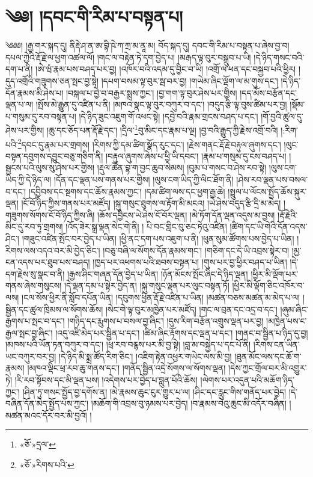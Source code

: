 \chapter{༄༅། །དབང་གི་རིམ་པ་བསྟན་པ།}༄༅༅། །རྒྱ་གར་སྐད་དུ། ནིརྡེ་ཤ་ན་ཨ་བྷི་ཥེ་ཀ་ཀྲ་མ་ནཱ་མ། བོད་སྐད་དུ། དབང་གི་རིམ་པ་བསྟན་པ་ཞེས་བྱ་བ། དཔལ་ཀྱེའི་རྡོ་རྗེ་ལ་ཕྱག་འཚལ་ལོ། །གང་ལ་བརྟེན་ཏེ་དག་བྱེད་པ། །མརྒད་ལྟ་བུར་བསྒྲུབ་པ་ཡི། །དེ་ཉིད་གསང་བའི་དག་པ་ནི། །ཨེ་ཝཾ་རྣམ་པས་བཤད་པར་བྱ། །འཁོར་བའི་འདམ་དུ་བྱིང་བ་ཡི། །འགྲོ་ལ་ཕན་དང་བསྐྱབ་པའི་ཕྱིར། །དུད་འགྲོའི་གཟུགས་ཅན་སྤང་བྱ་སྟེ། །དཔག་བསམ་ལྟ་བུར་སྦ་བར་བྱ། །གཡེམ་ཞིང་ལྡོག་ལ་མ་གུས་དང་། །དེ་ཉིད་དོན་རྣམས་མི་ཤེས་པ། །བསྐལ་པ་བྱེ་བ་བརྒྱར་སྨྲས་ཀྱང་། །བྱ་གག་ལྟ་བུར་ཤེས་པར་གྱིས། །དད་མོས་བརྩོན་དང་ལྡན་པ་ལ། །སྤོས་མེ་རྒྱུན་དུ་འཛིན་པ་ནི། །མཁའ་སྣང་ལྟ་བུར་བཀུར་བ་དང་། །བདུད་རྩི་ལྟ་བུས་ཚིམ་པར་བྱ། །སྡོམ་པ་གསུམ་དུ་རབ་བསྟན་པ། །དེ་ཉིད་ཟུང་འཇུག་གོ་འཕང་སྟེ། །དབྱེ་བའི་རྣམ་གྲངས་བཤད་པ་དང་། །གོ་བྱའི་ཚུལ་དུ་ཤེས་པར་གྱིས། །ཆུ་དང་ཅོད་པན་རྡོ་རྗེ་དང་། །དྲིལ་\footnote{«ཅོ་»དྲལ་}བུ་མིང་དང་རྣམ་པ་ལྔ། །བྱ་བའི་རྒྱུད་ཀྱི་རྗེས་འགྲོ་བའི། །:རིག་པའི་\footnote{«ཅོ་»རིགས་པའི་}དབང་དུ་རྣམ་པར་གྲགས། །རིགས་ཀྱི་དམ་ཚིག་སྣོད་རུང་དང་། །རྗེས་གནང་རྡོ་རྗེ་བརྟུལ་ཞུགས་དང་། །ལུང་བསྟན་དབུགས་དབྱུང་བཅུ་གཅིག་ནི། །བརྟུལ་ཞུགས་ཞེས་པ་ཕྱི་ཡི་དབང་། །རྣམ་པ་གསུམ་དུ་ངས་བཤད་པ། །སྦྱངས་པའི་ལུས་སུ་ཤེས་པར་གྱིས། །རྡུལ་ཚོན་བྷ་ག་བྱང་ཆུབ་སེམས། །བུམ་པ་གསང་བ་ཤེས་རབ་སྟེ། །ལུས་ངག་ཡིད་ཀྱི་དེ་ཉིད་ལ། །དོན་དང་ལྡན་པས་གནས་པར་གྱིས། །ལུས་ངག་ཡིད་ཀྱི་ལིང་ཐོག་ནི། །ཤེས་རབ་ལྡན་པས་བསལ་བ་དང་། །དབྱིབས་དང་སྔགས་དང་ཆོས་རྣམས་ཀྱང་། །དམ་ཚིག་ལས་དང་ཕྱག་རྒྱ་ཆེ། །སྤྲུལ་པ་ལོངས་སྤྱོད་ཆོས་སྐུར་ལྡན། །ངོ་བོ་ཉིད་ཀྱིས་གནས་པར་མཛོད། །སྐུ་གསུང་ཐུགས་ལ་རྟོག་མི་མངའ། །ཡེ་ཤེས་བདུད་རྩི་དྲི་མ་མེད། །གཟུགས་སོགས་ངོ་བོ་ཉིད་ཀྱིས་ཞི། །ཆོས་དབྱིངས་ཡེ་ཤེས་ངོ་བོར་ལྡན། །མེ་ཏོག་དོན་ལྡན་འདུས་མ་བྱས། །རྡོ་རྗེའི་མིང་དུ་རབ་ཏུ་གྲགས། །འོད་ཟེར་སྒྲ་ལྡན་སེང་གེ་ནི། །
པི་བང་གླིང་བུ་ཅང་ཏེའུ་འཛིན། །ཚིག་དང་ཡི་གེའི་དོན་འདས་ཤིང་། །གཟུང་འཛིན་སྤོང་བར་བྱེད་པ་ཡིན། །ཕྱི་ནང་དག་པས་འཇུག་པ་ནི། །ཕུན་སུམ་ཚོགས་པས་བྱེད་པ་ཡིན། །རིགས་ལས་འདའ་བར་མི་བྱེད་ཅིང་། །བཅུ་བཞི་ལ་སོགས་དོན་རྣམས་གང་། །གཅིག་དང་དེ་ཡི་འབྲས་སྟེར་བ། །མྱ་ངན་འདས་པར་ཐུབ་པས་བཤད། །ཁྱད་པར་འཕགས་པའི་ཐབས་བསྟན་པ། །གུས་པར་བྱ་ཕྱིར་བཤད་པ་ཡིན། །དེ་དག་རྗེས་སུ་སྣང་བ་ནི། །རྒྱས་ཤིང་གཞན་དོན་བྱེད་པ་ཡིན། །ཉོན་མོངས་སྤོང་ཞིང་དེ་ཉིད་ལྡན། །ཕྱིར་མི་ལྡོག་པར་གནས་ཞེས་གསུངས། །དེ་ལྡན་དམ་པ་སྟེར་བྱེད་ན། །སྐུ་གསུང་ལྡན་པར་ལུང་བསྟན་ཏོ། །ཕྱིར་མི་ལྡོག་ཅིང་འཁོར་བ་ལས། །ངལ་སོས་ཕྱིར་ནི་སློབ་དཔོན་ཡིན། །དབུགས་ཕྱིན་རྡོ་རྗེ་འཛིན་པ་ཡིན། །མཚན་བཅས་མཚན་མ་མེད་པ་ལ། །སྦྱིན་དང་ཚུལ་ཁྲིམས་ལ་སོགས་ཆོས། །སེང་གེ་ལྟ་བུར་མཁྱེན་པར་མཛོད། །གང་ལ་བྲན་དང་འདྲ་བ་དང་། །ཞུམ་ཞིང་རྒྱགས་པ་སྤང་བ་དང་། །གཉིད་དང་རྨུགས་པ་བསལ་བྱ་ཞིང་། །དུས་རིག་བརྩོན་འགྲུས་ལྡན་པར་བྱ། །མཁྱེན་པས་ང་རྒྱལ་སྤང་བྱ་ཞིང་། །འདུ་འཛི་མེད་པར་སྦྱིན་པ་དང་། །ཚིམ་ཞིང་རྟོགས་དང་ལྡན་པ་དང་། །གནང་བ་སྦྱིན་པ་ཉིད་དུ་བྱ། །མཁས་པའི་ཡོན་ཏན་བཀུར་བ་དང་། །ཕྲ་རབ་བརྙས་པར་མི་བྱ་སྟེ། །བླ་མ་བསྐྱེད་པ་དང་པོ་ནི། །རིགས་ངན་ཡིན་ཡང་བཀུར་བར་བྱ། །དེ་ཉིད་མི་སྨྲ་ཚོད་རིག་ཅིང་། །འཇིག་རྟེན་འཕྱར་གཡེང་ལས་མི་བྱ། །ཐུན་མོང་ལས་དང་ཆོ་ག་རྣམས། །མཁའ་ལྡིང་ཕྲ་རབ་ཆུ་གནས་དང་། །གནོད་སྦྱིན་འདྲེ་སོགས་ལ་སོགས་ལྡན། །དེས་ཀྱང་གྲོལ་བར་མི་འགྱུར་ཏེ། །རི་རབ་སྟོབས་དང་མི་ལྡན་པས། །འདེགས་པར་བྱེད་པ་བླུན་པོའི་ཆོས། །ལེགས་པར་འདུན་པའི་མཆོག་ཉིད་ཀྱང་། །ཤིན་ཏུ་གསང་སྤྱོད་བྱ་དགོས་ན། །མེ་རྣམས་ཆུང་ངུར་གྱུར་པ་ལ། །ཤིང་དང་རླུང་གིས་གནོད་པར་བྱེད། །དེ་བཞིན་དོན་མེད་སྤྱོད་པས་ཀྱང་། །མཆོག་གི་འབྲས་བུ་ཉམས་པར་བྱེད། །བ་རྣམས་བེའུ་ཆུང་མི་འདོར་བཞིན། །མཚན་མའང་དོར་བར་མི་བྱའོ། །
